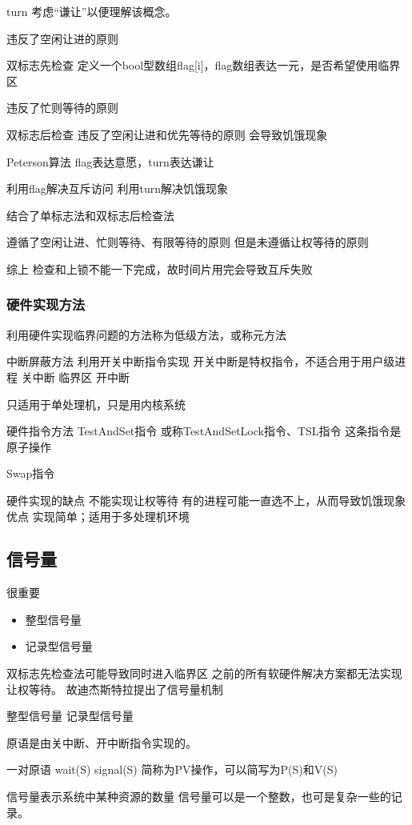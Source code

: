 turn 考虑“谦让”以便理解该概念。

违反了空闲让进的原则

双标志先检查
定义一个bool型数组flag[i]，flag数组表达一元，是否希望使用临界区

违反了忙则等待的原则

双标志后检查
违反了空闲让进和优先等待的原则
会导致饥饿现象

Peterson算法
flag表达意愿，turn表达谦让

利用flag解决互斥访问
利用turn解决饥饿现象

结合了单标志法和双标志后检查法

遵循了空闲让进、忙则等待、有限等待的原则 
但是未遵循让权等待的原则

综上
检查和上锁不能一下完成，故时间片用完会导致互斥失败

\subsubsection{硬件实现方法}
利用硬件实现临界问题的方法称为低级方法，或称元方法

中断屏蔽方法
利用开关中断指令实现
开关中断是特权指令，不适合用于用户级进程
关中断
临界区
开中断

只适用于单处理机，只是用内核系统

硬件指令方法
TestAndSet指令
或称TestAndSetLock指令、TSL指令
这条指令是原子操作

Swap指令



硬件实现的缺点
不能实现让权等待
有的进程可能一直选不上，从而导致饥饿现象
优点
实现简单；适用于多处理机环境


\subsection{信号量}
很重要
\begin{itemize}
	\item 整型信号量
	\item 记录型信号量
\end{itemize}
双标志先检查法可能导致同时进入临界区
之前的所有软硬件解决方案都无法实现让权等待。
故迪杰斯特拉提出了信号量机制

整型信号量
记录型信号量

原语是由关中断、开中断指令实现的。

一对原语
wait(S) signal(S)
简称为PV操作，可以简写为P(S)和V(S)

信号量表示系统中某种资源的数量
信号量可以是一个整数，也可是复杂一些的记录。

